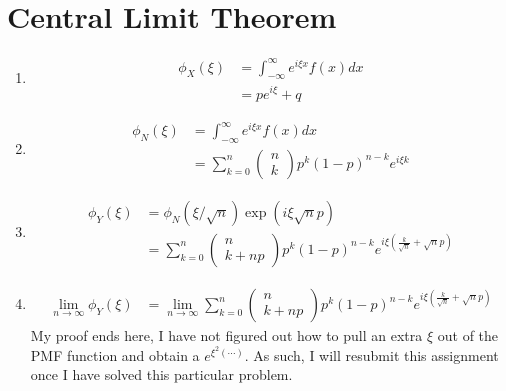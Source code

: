 \documentclass{article}
\begin{document}
\section{Central Limit Theorem}
    \begin{enumerate}[label=\roman*)]
        \item 
            \begin{align*}
                \phi_X(\xi) &= \int_{-\infty}^{\infty} e^{i\xi x}f(x)dx 
                \\
                &= pe^{i\xi} + q
            \end{align*}
        \item 
            \begin{align*}
                \phi_N(\xi) &= \int_{-\infty}^{\infty} e^{i\xi x}f(x)dx 
                \\
                &= \sum_{k=0}^n \left(\begin{array}{c} n\\k\end{array}\right)
                p^k(1-p)^{n-k}e^{i\xi k}
            \end{align*}
        \item 
            \begin{align*}
                \phi_Y(\xi) &= \phi_N(\xi/\sqrt{n})\exp(i\xi\sqrt{n}p)
                \\
                &= \sum_{k=0}^{n} \left(\begin{array}{c} n\\k +
                np\end{array}\right)
                p^{k}(1-p)^{n-k}e^{i\xi\left(\frac{k}{\sqrt{n}}+\sqrt{n}p\right)}
            \end{align*}
        \item
            \begin{align*}
                \lim_{n\to\infty} \phi_Y(\xi) &= 
                \lim_{n\to\infty}\sum_{k=0}^{n} \left(\begin{array}{c} n\\k +
                np\end{array}\right)
                p^{k}(1-p)^{n-k}e^{i\xi\left(\frac{k}{\sqrt{n}}+\sqrt{n}p\right)}
            \end{align*}
            My proof ends here, I have not figured out how to pull an extra
            $\xi$ out of the PMF function and obtain a $e^{\xi^2(\cdots)}$. As
            such, I will resubmit this assignment once I have solved this
            particular problem. 
    \end{enumerate}
\end{document}
